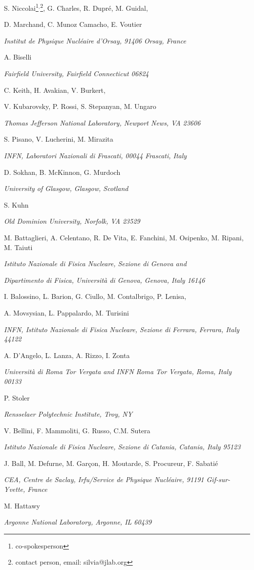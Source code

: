 \documentclass[a4paper,12pt]{report}
\begin{document}
\vskip 0.5cm

\centerline{S. Niccolai\footnote{co-spokesperson}$^,$\footnote{contact person, email: silvia@jlab.org}, G. Charles, R. Dupr\'e, M. Guidal,}
\centerline{D. Marchand, C. Munoz Camacho, E. Voutier}
\centerline{\it Institut de Physique Nucl\'eaire d'Orsay, 91406 Orsay, France}
\vskip 0.4cm
\centerline{A. Biselli\footnotemark[1]}
\centerline{\it Fairfield University, Fairfield Connecticut 06824}
\vskip 0.4cm
\centerline{C. Keith\footnotemark[1], H. Avakian, V. Burkert,} 
\centerline{V. Kubarovsky, P. Rossi, S. Stepanyan, M. Ungaro}
\centerline{\it Thomas Jefferson National Laboratory, Newport News, VA 23606}
\vskip 0.4cm
\centerline{S. Pisano\footnotemark[1], V. Lucherini, M. Mirazita}
\centerline{\it INFN, Laboratori Nazionali di Frascati, 00044 Frascati, Italy}
\vskip 0.4cm
\centerline{D. Sokhan\footnotemark[1], B. McKinnon, G. Murdoch}
\centerline{\it University of Glasgow, Glasgow, Scotland}
\vskip 0.4cm
\centerline{S. Kuhn\footnotemark[1]}
\centerline{\it Old Dominion University, Norfolk, VA 23529}
\vskip 0.4cm
\centerline{M. Battaglieri, A. Celentano, R. De Vita, E. Fanchini, M. Osipenko, M. Ripani, M. Taiuti}
\centerline{\it Istituto Nazionale di Fisica Nucleare, Sezione di Genova and }
\centerline{\it Dipartimento di Fisica, Universit\`a di Genova, Genova, Italy 16146}
\vskip 0.4cm
\centerline{I. Balossino, L. Barion, G. Ciullo, M. Contalbrigo, P. Lenisa,}
\centerline{A. Movsysian, L. Pappalardo, M. Turisini}
\centerline{\it INFN, Istituto Nazionale di Fisica Nucleare, Sezione di Ferrara, Ferrara, Italy 44122}
\vskip 0.4cm
\centerline{A. D'Angelo, L. Lanza, A. Rizzo, I. Zonta}
\centerline{\it Universit\`a di Roma Tor Vergata and INFN Roma Tor Vergata, Roma, Italy 00133}
\centerline{P. Stoler}
\centerline{\it Rensselaer Polytechnic Institute, Troy, NY}
\vskip 0.4cm
\centerline{V. Bellini, F. Mammoliti, G. Russo, C.M. Sutera}
\centerline{\it Istituto Nazionale di Fisica Nucleare, Sezione di Catania, Catania, Italy 95123} 
\vskip 0.4cm
\centerline{J. Ball, M. Defurne, M. Gar\c{c}on, H. Moutarde, S. Procureur, F. Sabati\'e}
\centerline{\it CEA, Centre de Saclay, Irfu/Service de Physique Nucl\'eaire, 91191 Gif-sur-Yvette, France}
\vskip 0.4cm
\centerline{M. Hattawy}
\centerline{\it Argonne National Laboratory, Argonne, IL 60439}
\vskip 0.4cm
\date{}
\end{document}
